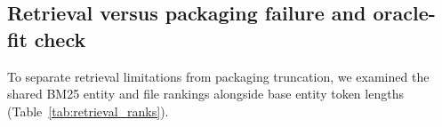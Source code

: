 \documentclass[11pt]{article}
\begin{document}
\subsection{Retrieval versus packaging failure and oracle-fit check}

To separate retrieval limitations from packaging truncation, we examined the
shared BM25 entity and file rankings alongside base entity token lengths
(Table~\ref{tab:retrieval_ranks}).

\begin{table}[tb]
\centering
\caption{BM25 retrieval rank and oracle-fit token check across the 10 fresh tasks.
Ranks reflect position within the shared BM25 top-10 pool.  Oracle fit indicates
whether the full enclosing function or class of the reference edit fits within
the 4{,}000-token evidence budget (token count in parentheses).}
\label{tab:retrieval_ranks}
\resizebox{\linewidth}{!}{}
\end{table}
\end{document}
